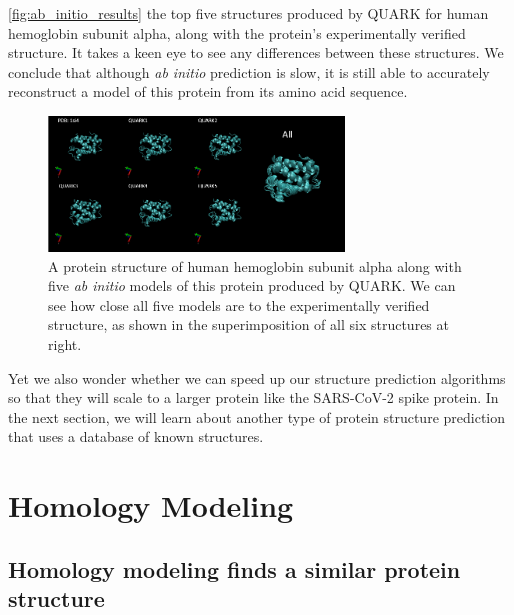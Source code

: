 \autoref{fig:ab_initio_results} the top five structures produced by QUARK for human hemoglobin subunit alpha, along with the protein's experimentally verified structure. It takes a keen eye to see any differences between these structures. We conclude that although \textit{ab initio} prediction is slow, it is still able to accurately reconstruct a model of this protein from its amino acid sequence.

\begin{figure}[h]
	\centering
	\mySfFamily
	\includegraphics[width = 0.7\textwidth]{../images/ab_initio_results.png}
	\caption{A protein structure of human hemoglobin subunit alpha along with five \textit{ab initio} models of this protein produced by QUARK. We can see how close all five models are to the experimentally verified structure, as shown in the superimposition of all six structures at right.}
	\label{fig:ab_initio_results}
\end{figure}

Yet we also wonder whether we can speed up our structure prediction algorithms so that they will scale to a larger protein like the SARS-CoV-2 spike protein. In the next section, we will learn about another type of protein structure prediction that uses a database of known structures.

\begin{qbox}\end{qbox}

\FloatBarrier
{}

\section{Homology Modeling}
\label{sec:homology}
\subsection{Homology modeling finds a similar protein structure}

